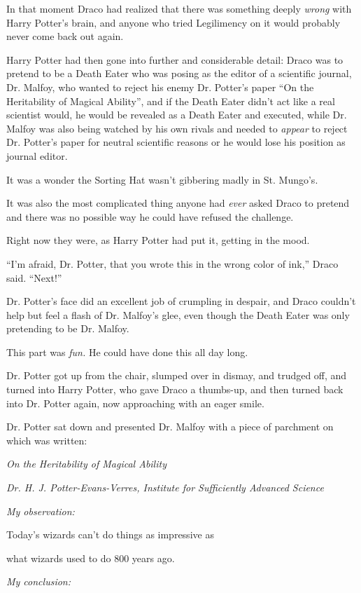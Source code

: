 In that moment Draco had realized that there was something deeply
\emph{wrong} with Harry Potter's brain, and anyone who tried Legilimency
on it would probably never come back out again.

Harry Potter had then gone into further and considerable detail: Draco
was to pretend to be a Death Eater who was posing as the editor of a
scientific journal, Dr. Malfoy, who wanted to reject his enemy Dr.
Potter's paper ``On the Heritability of Magical Ability'', and if the
Death Eater didn't act like a real scientist would, he would be revealed
as a Death Eater and executed, while Dr. Malfoy was also being watched
by his own rivals and needed to \emph{appear} to reject Dr. Potter's
paper for neutral scientific reasons or he would lose his position as
journal editor.

It was a wonder the Sorting Hat wasn't gibbering madly in St. Mungo's.

It was also the most complicated thing anyone had \emph{ever} asked
Draco to pretend and there was no possible way he could have refused the
challenge.

Right now they were, as Harry Potter had put it, getting in the mood.

``I'm afraid, Dr. Potter, that you wrote this in the wrong color of
ink,'' Draco said. ``Next!''

Dr. Potter's face did an excellent job of crumpling in despair, and
Draco couldn't help but feel a flash of Dr. Malfoy's glee, even though
the Death Eater was only pretending to be Dr. Malfoy.

This part was \emph{fun.} He could have done this all day long.

Dr. Potter got up from the chair, slumped over in dismay, and trudged
off, and turned into Harry Potter, who gave Draco a thumbs-up, and then
turned back into Dr. Potter again, now approaching with an eager smile.

Dr. Potter sat down and presented Dr. Malfoy with a piece of parchment
on which was written:

\emph{On the Heritability of Magical Ability}

\emph{Dr. H. J. Potter-Evans-Verres, Institute for Sufficiently Advanced
Science}

\emph{My observation:}

Today's wizards can't do things as impressive as

what wizards used to do 800 years ago.

\emph{My conclusion:}

